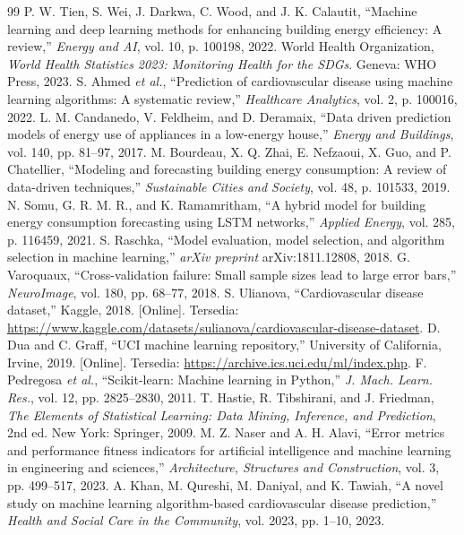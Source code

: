 \documentclass[conference]{IEEEtran}
\begin{document}
\begin{thebibliography}{99}
 P. W. Tien, S. Wei, J. Darkwa, C. Wood, and J. K. Calautit, ``Machine learning and deep learning methods for enhancing building energy efficiency: A review,'' \emph{Energy and AI}, vol. 10, p. 100198, 2022.
 World Health Organization, \emph{World Health Statistics 2023: Monitoring Health for the SDGs}. Geneva: WHO Press, 2023.
 S. Ahmed \emph{et al.}, ``Prediction of cardiovascular disease using machine learning algorithms: A systematic review,'' \emph{Healthcare Analytics}, vol. 2, p. 100016, 2022.
 L. M. Candanedo, V. Feldheim, and D. Deramaix, ``Data driven prediction models of energy use of appliances in a low-energy house,'' \emph{Energy and Buildings}, vol. 140, pp. 81--97, 2017.
 M. Bourdeau, X. Q. Zhai, E. Nefzaoui, X. Guo, and P. Chatellier, ``Modeling and forecasting building energy consumption: A review of data-driven techniques,'' \emph{Sustainable Cities and Society}, vol. 48, p. 101533, 2019.
 N. Somu, G. R. M. R., and K. Ramamritham, ``A hybrid model for building energy consumption forecasting using LSTM networks,'' \emph{Applied Energy}, vol. 285, p. 116459, 2021.
 S. Raschka, ``Model evaluation, model selection, and algorithm selection in machine learning,'' \emph{arXiv preprint} arXiv:1811.12808, 2018.
 G. Varoquaux, ``Cross-validation failure: Small sample sizes lead to large error bars,'' \emph{NeuroImage}, vol. 180, pp. 68--77, 2018.
 S. Ulianova, ``Cardiovascular disease dataset,'' Kaggle, 2018. [Online]. Tersedia: \url{https://www.kaggle.com/datasets/sulianova/cardiovascular-disease-dataset}.
 D. Dua and C. Graff, ``UCI machine learning repository,'' University of California, Irvine, 2019. [Online]. Tersedia: \url{https://archive.ics.uci.edu/ml/index.php}.
 F. Pedregosa \emph{et al.}, ``Scikit-learn: Machine learning in Python,'' \emph{J. Mach. Learn. Res.}, vol. 12, pp. 2825--2830, 2011.
 T. Hastie, R. Tibshirani, and J. Friedman, \emph{The Elements of Statistical Learning: Data Mining, Inference, and Prediction}, 2nd ed. New York: Springer, 2009.
 M. Z. Naser and A. H. Alavi, ``Error metrics and performance fitness indicators for artificial intelligence and machine learning in engineering and sciences,'' \emph{Architecture, Structures and Construction}, vol. 3, pp. 499--517, 2023.
 A. Khan, M. Qureshi, M. Daniyal, and K. Tawiah, ``A novel study on machine learning algorithm-based cardiovascular disease prediction,'' \emph{Health and Social Care in the Community}, vol. 2023, pp. 1--10, 2023.

\end{thebibliography}
\end{document}
